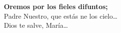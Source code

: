 \textbf{Oremos por los fieles difuntos;}\\
Padre Nuestro, que estás ne los cielo\ldots\\
Dios te salve, María\ldots\\[1mm]
\\[1mm]

